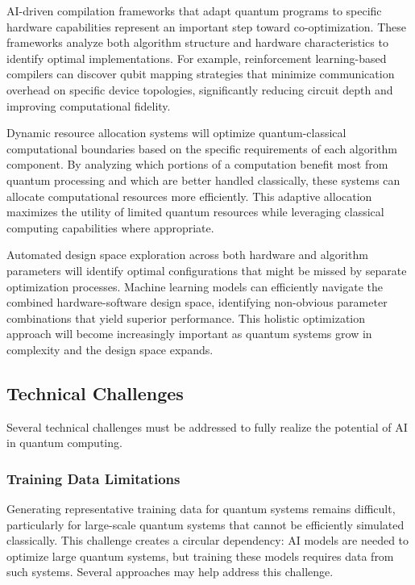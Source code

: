 AI-driven compilation frameworks that adapt quantum programs to specific hardware capabilities represent an important step toward co-optimization. These frameworks analyze both algorithm structure and hardware characteristics to identify optimal implementations. For example, reinforcement learning-based compilers can discover qubit mapping strategies that minimize communication overhead on specific device topologies, significantly reducing circuit depth and improving computational fidelity.

Dynamic resource allocation systems will optimize quantum-classical computational boundaries based on the specific requirements of each algorithm component. By analyzing which portions of a computation benefit most from quantum processing and which are better handled classically, these systems can allocate computational resources more efficiently. This adaptive allocation maximizes the utility of limited quantum resources while leveraging classical computing capabilities where appropriate.

Automated design space exploration across both hardware and algorithm parameters will identify optimal configurations that might be missed by separate optimization processes. Machine learning models can efficiently navigate the combined hardware-software design space, identifying non-obvious parameter combinations that yield superior performance. This holistic optimization approach will become increasingly important as quantum systems grow in complexity and the design space expands.

\subsection{Technical Challenges}

Several technical challenges must be addressed to fully realize the potential of AI in quantum computing.

\subsubsection{Training Data Limitations}

Generating representative training data for quantum systems remains difficult, particularly for large-scale quantum systems that cannot be efficiently simulated classically. This challenge creates a circular dependency: AI models are needed to optimize large quantum systems, but training these models requires data from such systems. Several approaches may help address this challenge.


